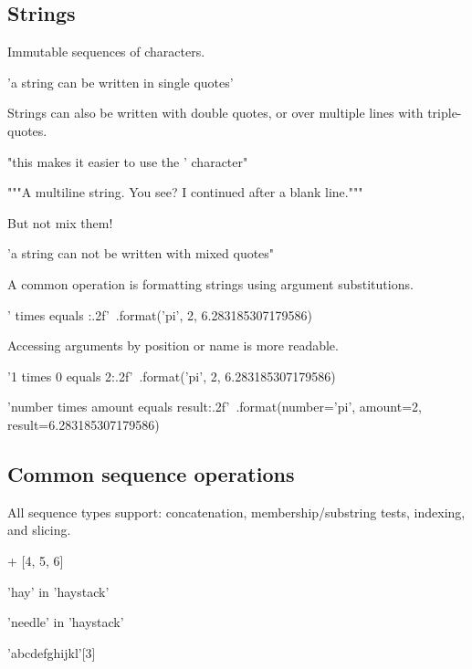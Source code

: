 \documentclass[aspectratio=1610,slidestop]{beamer}
\begin{document}
\subsection{Strings}
\begin{pframe}
Immutable sequences of characters.
\begin{pyconsole}
'a string can be written in single quotes'
\end{pyconsole}
\medskip
\medskip
Strings can also be written with double quotes, or over multiple lines with
triple-quotes.
\begin{pyconsole}
"this makes it easier to use the ' character"
\end{pyconsole}
\medskip
\begin{pyconsole}
"""A multiline string.
You see? I continued after a blank line."""
\end{pyconsole}
\end{pframe}

\begin{pframe}
But not mix them!
\begin{pyconsole}
'a string can not be written with mixed quotes"
\end{pyconsole}
\end{pframe}

\begin{pframe}
\vspace{-0.3cm}
A common operation is formatting strings using argument substitutions.
\begin{pyconsole}
'{} times {} equals {:.2f}'\
    .format('pi', 2, 6.283185307179586)
\end{pyconsole}
\medskip
\medskip
Accessing arguments by position or name is more readable.
\begin{pyconsole}
'{1} times {0} equals {2:.2f}'\
    .format('pi', 2, 6.283185307179586)

'{number} times {amount} equals {result:.2f}'\
    .format(number='pi', amount=2, result=6.283185307179586)
\end{pyconsole}
\end{pframe}


\subsection{Common sequence operations}
\begin{pframe}
All sequence types support: concatenation, membership/substring tests,
indexing, and slicing.
\begin{pyconsole}
[1, 2, 3] + [4, 5, 6]

'hay' in 'haystack'

'needle' in 'haystack'

'abcdefghijkl'[3]
\end{pyconsole}
\end{pframe}
\end{document}
